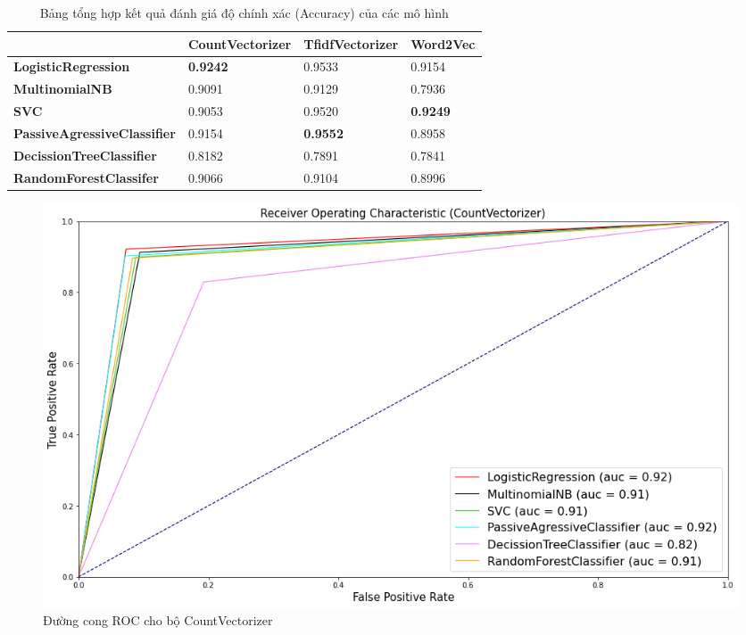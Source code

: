 \documentclass[12pt,a4paper,oneside]{book}
\begin{document}
	\begin{table}[H]
		\renewcommand{\arraystretch}{1.5}
		\small
		\begin{center}
			\begin{tabular}{ | P{12.8em} | P{3.3cm}| P{3cm} | P{2.5cm} |} 
			\hline
		      & \textbf{CountVectorizer} & \textbf{TfidfVectorizer} & \textbf{Word2Vec} \\ 
			\hline
			\textbf{LogisticRegression} & \textbf{0.9242} & 0.9533 & 0.9154\\ 
			\hline
			\textbf{MultinomialNB} & 0.9091 & 0.9129 & 0.7936 \\
			\hline
			\textbf{SVC} & 0.9053 & 0.9520 & \textbf{0.9249} \\
			\hline
			\textbf{PassiveAgressiveClassifier} & 0.9154 & \textbf{0.9552} & 0.8958 \\
			\hline
			\textbf{DecissionTreeClassifier} & 0.8182 & 0.7891 & 0.7841 \\
			\hline
			\textbf{RandomForestClassifer} & 0.9066 & 0.9104 & 0.8996 \\
			\hline
			\end{tabular}
		\end{center}
		\caption{Bảng tổng hợp kết quả đánh giá độ chính xác (Accuracy) của các mô hình}
	\end{table}
	\hfill
	\begin{figure}[H]
		\centering
		\includegraphics[width=1\textwidth]{cvroc}
		\caption{Đường cong ROC cho bộ CountVectorizer}
	\end{figure}
	
\end{document}
